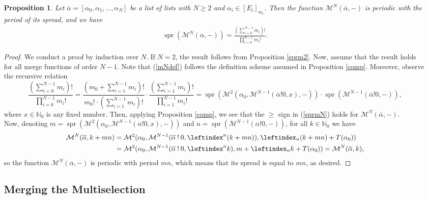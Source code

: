 \documentclass[a4paper, 10pt]{article}
\theoremstyle{plain}
\newtheorem{proposition}[theorem]{Proposition}
\theoremstyle{definition}
\newcommand{\N}{\mathbb{N}}
\newcommand{\wo}{\mathbin{!}}
\newcommand{\li}{\leftindex}
\newcommand{\spr}[1]{\operatorname{spr}(#1)}
\newcommand{\m}{\mathcal{M}}
\begin{document}
\begin{proposition}
  Let $\overline{\alpha} = [\alpha_0, \alpha_1, ..., \alpha_N]$ be a list of lists with $N \ge 2$ and $\alpha_i \in [E_i]_{m_i}$. Then the function $\m^N (\overline{\alpha}, -)$ is periodic with the period of its spread, and we have
  \begin{align}
    \label{sprmN}
    \spr{\m^N (\overline{\alpha}, -)} = \frac{\left( \sum_{i = 0}^{N-1} m_i \right)!}{\prod_{i = 0}^{N-1} m_i !}.
  \end{align}
\end{proposition}
\begin{proof}
  We conduct a proof by induction over $N$. If $N = 2$, the result follows from Proposition \ref{sprm2}. Now, assume that the result holds for all merge functions of order $N-1$. Note that (\ref{mNdef}) follows the definition scheme assumed in Proposition \ref{comp}. Moreover, observe the recursive relation
  \[
    \frac{\left( \sum_{i = 0}^{N-1} m_i \right)!}{\prod_{i = 0}^{N-1} m_i !} = \frac{\left( m_0 + \sum_{i=1}^{N-1} m_i \right )!}{m_0! \cdot \left( \sum_{i=1}^{N-1} m_i \right)! } \cdot \frac{\left( \sum_{i = 1}^{N-1} m_i \right)!}{\prod_{i = 1}^{N-1} m_i !} = \spr{\m^2 (\alpha_0, \m^{N-1}(\overline{\alpha} \wo 0, x), -)} \cdot \spr{\m^{N-1}(\overline{\alpha} \wo 0, -)},
  \]
  where $x \in \N_0$ is any fixed number. Then, applying Proposition \ref{comp}, we see that the $\ge$ sign in (\ref{sprmN}) holds for $\m^N (\overline{\alpha}, -)$.\\
  Now, denoting $m = \spr{\m^2 (\alpha_0, \m^{N-1}(\overline{\alpha} \wo 0, x), -)}$ and $n = \spr{\m^{N-1}(\overline{\alpha} \wo 0, -)}$, for all $k \in \N_0$ we have
  \begin{align*}
    \m^N(\overline{\alpha}, k + mn) &= \m^2(\alpha_0, \m^{N-1}(\overline{\alpha} \wo 0, \li^n (k + mn)), \li_n (k + mn) + T(\alpha_0))\\
    &= \m^2(\alpha_0, \m^{N-1}(\overline{\alpha} \wo 0, \li^n k), m + \li_n k + T(\alpha_0)) = \m^N (\overline{\alpha}, k),
  \end{align*}
  so the function $\m^N(\overline{\alpha}, -)$ is periodic with period $mn$, which means that its spread is equal to $mn$, as desired.
\end{proof}

\subsection{Merging the Multiselection} \label{mergemult}
\end{document}
